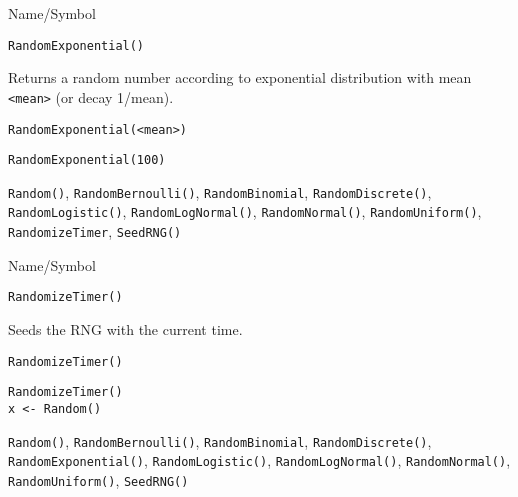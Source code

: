 \rl


\begin{desc}{Name/Symbol}
\item[Name/Symbol]	\verb+RandomExponential()+

\item[Description]	Returns a random number according to exponential 
		distribution with mean \verb+<mean>+ (or decay 1/mean).

\item[Usage]		
\begin{verbatim}
RandomExponential(<mean>)
\end{verbatim}

\item[Example]	
\begin{verbatim}
RandomExponential(100)
\end{verbatim}

\item[See Also]	\verb+Random()+, \verb+RandomBernoulli()+, \verb+RandomBinomial+,
		\verb+RandomDiscrete()+, \verb+RandomLogistic()+, \verb+RandomLogNormal()+, 
		\verb+RandomNormal()+, \verb+RandomUniform()+, \verb+RandomizeTimer+, \verb+SeedRNG()+
\end{desc}

\rl                            


\begin{desc}{Name/Symbol}
\item[Name/Symbol]	\verb+RandomizeTimer()+

\item[Description]	Seeds the RNG with the current time.

\item[Usage]
\begin{verbatim}
RandomizeTimer()
\end{verbatim}

\item[Example]	
\begin{verbatim}
RandomizeTimer()
x <- Random()
\end{verbatim}
	     
\item[See Also]	\verb+Random()+, \verb+RandomBernoulli()+, \verb+RandomBinomial+,
		\verb+RandomDiscrete()+, \verb+RandomExponential()+, \verb+RandomLogistic()+,
		\verb+RandomLogNormal()+, \verb+RandomNormal()+, \verb+RandomUniform()+, \verb+SeedRNG()+
\end{desc}

\rl



